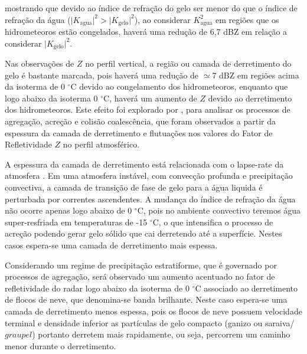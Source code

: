 mostrando que devido ao índice de refração do gelo ser menor do que o índice de refração da água ($\vert K_{\mathrm{agua}}\vert^2 > \vert K_{\mathrm{gelo}}\vert^2$), ao considerar $K_{\mathrm{agua}}^2$ em regiões que os hidrometeoros estão congelados, haverá uma redução de 6,7 dBZ em relação a considerar $\vert K_{\mathrm{gelo}}\vert^2$.  

Nas observações de $Z$ no perfil vertical, a região ou camada de derretimento do gelo é bastante marcada, pois haverá uma redução de $\simeq$7 dBZ em regiões acima da isoterma de 0 $^{\circ}$C devido ao congelamento dos hidrometeoros, enquanto que logo abaixo da isoterma 0 $^{\circ}$C, haverá um aumento de $Z$ devido ao derretimento dos hidrometeoros. Este efeito foi explorado por  , para analisar os processos  de  agregação, acreção e colisão coalescência, que foram observados a partir da espessura da camada de derretimento e flutuações nos valores do Fator de Refletividade $Z$ no perfil atmosférico. 

A espessura da camada de derretimento está relacionada com o lapse-rate da atmosfera \cite[p.~462]{mason1971_2ed}. Em uma atmosfera instável, com convecção profunda e precipitação convectiva, a camada de transição de fase de gelo para a água liquida é perturbada por correntes ascendentes. A mudança do índice de refração da água não ocorre apenas logo abaixo de 0 $^{\circ}$C, pois no ambiente convectivo teremos água super-resfriada em temperaturas de -15 $^{\circ}$C, o que intensifica o processo de acreção podendo gerar gelo sólido que cai derretendo até a superfície. Nestes casos espera-se uma camada de derretimento mais espessa.

Considerando um regime de precipitação estratiforme, que é governado por processos de agregação, será observado um aumento acentuado no fator de refletividade do radar logo abaixo da isoterma de 0 $^{\circ}$C associado ao derretimento de flocos de neve, que denomina-se banda brilhante. Neste caso espera-se uma camada de derretimento menos espessa, pois os flocos de neve possuem velocidade terminal e densidade inferior as partículas de gelo compacto (ganizo ou saraiva/$graupel$) portanto derretem mais rapidamente, ou seja, percorrem um caminho menor durante o derretimento. 



